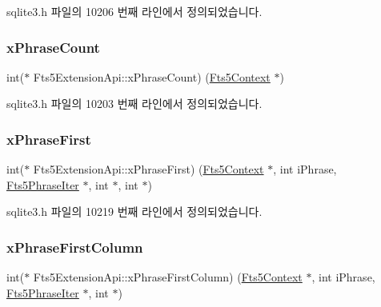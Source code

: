 sqlite3.\+h 파일의 10206 번째 라인에서 정의되었습니다.

\mbox{\label{struct_fts5_extension_api_a3ba0207080a9ca498625eefcc120bf1e}} 
\subsubsection{\texorpdfstring{x\+Phrase\+Count}{xPhraseCount}}
{\footnotesize\ttfamily int($\ast$ Fts5\+Extension\+Api\+::x\+Phrase\+Count) (\hyperlink{sqlite3_8h_a97821b95ebebd43db901977ffd5b26bc}{Fts5\+Context} $\ast$)}



sqlite3.\+h 파일의 10203 번째 라인에서 정의되었습니다.

\mbox{\label{struct_fts5_extension_api_ae2584a3afa2a70504847600e609d43ad}} 
\subsubsection{\texorpdfstring{x\+Phrase\+First}{xPhraseFirst}}
{\footnotesize\ttfamily int($\ast$ Fts5\+Extension\+Api\+::x\+Phrase\+First) (\hyperlink{sqlite3_8h_a97821b95ebebd43db901977ffd5b26bc}{Fts5\+Context} $\ast$, int i\+Phrase, \hyperlink{struct_fts5_phrase_iter}{Fts5\+Phrase\+Iter} $\ast$, int $\ast$, int $\ast$)}



sqlite3.\+h 파일의 10219 번째 라인에서 정의되었습니다.

\mbox{\label{struct_fts5_extension_api_ac57daf9650e3f0c25432bbe348bc124f}} 
\subsubsection{\texorpdfstring{x\+Phrase\+First\+Column}{xPhraseFirstColumn}}
{\footnotesize\ttfamily int($\ast$ Fts5\+Extension\+Api\+::x\+Phrase\+First\+Column) (\hyperlink{sqlite3_8h_a97821b95ebebd43db901977ffd5b26bc}{Fts5\+Context} $\ast$, int i\+Phrase, \hyperlink{struct_fts5_phrase_iter}{Fts5\+Phrase\+Iter} $\ast$, int $\ast$)}




